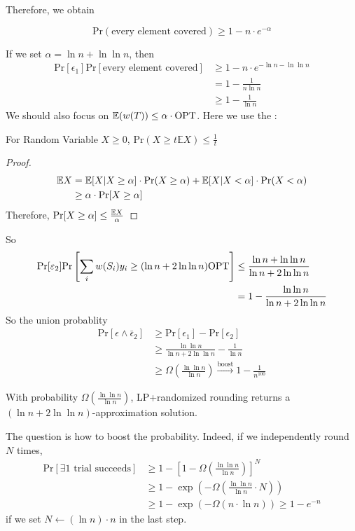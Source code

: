 Therefore, we obtain 
\begin{claim}
    \[\mathrm{Pr}(\text{every element covered}) \geq 1-n\cdot e^{-\alpha}\]
\end{claim}
If we set  $ \alpha=\ln n+\ln\ln n $, then 
\begin{align*}
    \mathrm{Pr}[\epsilon_1]\mathrm{Pr}[\text{every element covered}]&\geq 1-n\cdot e^{-\ln n-\ln\ln n}\\
    &=1-\frac{1}{n\ln n}\\
    &\geq 1-\frac{1}{\ln n}
\end{align*} 
We should also focus on  $ \mathbb E(w(T)) \leq \alpha\cdot\mathrm{OPT} $. Here we use the :
\begin{theorem}
    For Random Variable  $ X \geq 0 $,  $ \mathrm{Pr}(X \geq t\mathbb EX) \leq \frac{1}{t} $  
\end{theorem} 
\begin{proof}
    \begin{align*}
        \mathbb E X&=\mathbb E[X|X \geq \alpha]\cdot \mathrm{Pr}(X \geq \alpha)+ \mathbb E[X|X < \alpha]\cdot \mathrm{Pr}(X < \alpha)\\
        & \geq \alpha\cdot\mathrm{Pr}[X \geq \alpha]
    \end{align*}
    Therefore,  $ \mathrm{Pr}[X \geq \alpha] \leq \frac{\mathbb E X}{\alpha} $ 
\end{proof}
So 
\begin{align*}
    \mathrm{Pr}[\varepsilon_2]\mathrm{Pr}\left[\sum_{i}w(S_i)y_i\geq (\ln n+2\ln\ln n)\mathrm{OPT}\right]& \leq \frac{\ln n+\ln\ln n}{\ln n+2\ln \ln n} \\
    &=1-\frac{\ln \ln n}{\ln n+2\ln\ln n}
\end{align*}
So the union probablity 
\[\begin{aligned}
    \mathrm{Pr}[\epsilon\wedge \bar{\epsilon}_2]& \geq \mathrm{Pr}[\epsilon_1]-\mathrm{Pr}[\epsilon_2]\\
    & \geq \frac{\ln\ln n}{\ln n+2\ln\ln n}-\frac{1}{\ln n}\\
    & \geq \Omega(\frac{\ln\ln n}{\ln n})\xrightarrow{\text{boost}}1-\frac{1}{n^{100}}
\end{aligned}\]

\begin{theorem}
    With probability  $ \Omega(\frac{\ln\ln n}{\ln n}) $, LP+randomized rounding returns a  $ (\ln n+2\ln \ln n) $-approximation solution.  
\end{theorem}

The question is how to boost the probability. Indeed, if we independently round  $ N  $ times, 
\begin{align*}
    \mathrm{Pr}[\exists 1\text{ trial succeeds}]& \geq 1-[1-\Omega(\frac{\ln\ln n}{\ln n})]^N\\
    & \geq 1-\exp(-\Omega(\frac{\ln\ln n}{\ln n}\cdot N))\\
    & \geq 1-\exp(-\Omega(n\cdot\ln n)) \geq 1-e^{-n}
\end{align*}
if we set  $ N\leftarrow (\ln n)\cdot n $ in the last step.


